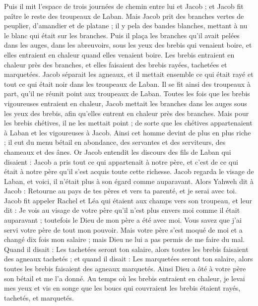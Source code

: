 \begin{multicols}{2}
Puis il mit l'espace de trois journées de chemin entre lui et Jacob ; et Jacob fit paître le reste des troupeaux de Laban.
Mais Jacob prit des branches vertes de peuplier, d’amandier et de platane ; il y pela des bandes blanches,  mettant à nu le blanc qui était sur les branches.
Puis il plaça les branches qu’il avait pelées dans les auges, dans les abreuvoirs, sous les yeux des brebis qui venaient boire, et elles entraient en chaleur quand elles venaient boire.
Les brebis entraient en chaleur près des branches, et elles faisaient des brebis rayées, tachetées et marquetées.
Jacob séparait les agneaux, et il mettait ensemble ce qui était rayé et tout ce qui était noir dans les troupeaux de Laban. Il se fit ainsi des troupeaux à part, qu’il ne réunit point aux troupeaux de Laban.
Toutes les fois que les brebis vigoureuses entraient en chaleur, Jacob mettait les branches dans les auges sous les yeux des brebis, afin qu'elles entrent en chaleur près des  branches.
Mais pour les brebis chétives, il ne les mettait point ; de sorte que les chétives appartenaient à Laban et les vigoureuses à Jacob.
Ainsi cet homme devint de plus en plus riche ; il eut du menu bétail en abondance, des servantes et des serviteurs, des chameaux et des ânes.
\VerseOne{}Or Jacob entendit les discours des fils de Laban qui disaient : Jacob a pris tout ce qui appartenait à notre père, et c’est de ce qui était à notre père qu’il s’est acquis toute cette richesse.
Jacob regarda le visage de Laban, et voici, il n'était plus à son égard comme auparavant.
Alors Yahweh dit à Jacob : Retourne au pays de tes pères et vers ta parenté, et je serai avec toi.
Jacob fit appeler Rachel et Léa qui étaient aux champs vers son troupeau,
et leur dit : Je vois au visage de votre père qu'il n'est plus envers moi comme il était auparavant ; toutefois le Dieu de mon père a été avec moi.
Vous savez que j'ai servi votre père de tout mon pouvoir.
Mais votre père s'est moqué de moi et a changé dix fois mon salaire ; mais Dieu ne lui a pas permis de me faire du mal.
Quand il disait : Les tachetées seront ton salaire, alors toutes les brebis faisaient des agneaux tachetés ; et quand il disait : Les marquetées seront ton salaire, alors toutes les brebis faisaient des agneaux marquetés.
Ainsi Dieu a ôté à votre père son bétail et me l'a donné.
Au temps où les brebis entraient en chaleur, je levai mes yeux et vis en songe que les boucs qui couvraient les brebis étaient rayés, tachetés, et marquetés.

\end{multicols}
